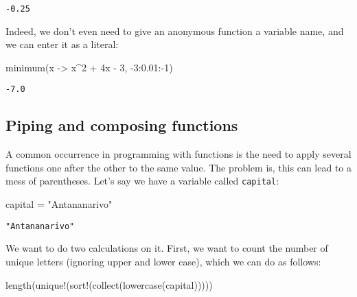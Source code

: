 \documentclass[
  letterpaper,
  DIV=11,
  numbers=noendperiod]{scrreprt}
\newenvironment{Shaded}{\begin{snugshade}}{\end{snugshade}}
\newcommand{\FloatTok}[1]{\textcolor[rgb]{0.68,0.00,0.00}{#1}}
\newcommand{\FunctionTok}[1]{\textcolor[rgb]{0.28,0.35,0.67}{#1}}
\newcommand{\NormalTok}[1]{\textcolor[rgb]{0.00,0.23,0.31}{#1}}
\newcommand{\OperatorTok}[1]{\textcolor[rgb]{0.37,0.37,0.37}{#1}}
\newcommand{\StringTok}[1]{\textcolor[rgb]{0.13,0.47,0.30}{#1}}
\begin{document}
\begin{verbatim}
-0.25
\end{verbatim}

Indeed, we don't even need to give an anonymous function a variable
name, and we can enter it as a literal:

\begin{Shaded}
\begin{Highlighting}[]
\FunctionTok{minimum}\NormalTok{(x }\OperatorTok{{-}\textgreater{}}\NormalTok{ x}\OperatorTok{\^{}}\FloatTok{2} \OperatorTok{+} \FloatTok{4}\NormalTok{x }\OperatorTok{{-}} \FloatTok{3}\NormalTok{, }\OperatorTok{{-}}\FloatTok{3}\OperatorTok{:}\FloatTok{0.01}\OperatorTok{:{-}}\FloatTok{1}\NormalTok{)}
\end{Highlighting}
\end{Shaded}

\begin{verbatim}
-7.0
\end{verbatim}

\hypertarget{piping-and-composing-functions}{%
\subsection{Piping and composing
functions}\label{piping-and-composing-functions}}

A common occurrence in programming with functions is the need to apply
several functions one after the other to the same value. The problem is,
this can lead to a mess of parentheses. Let's say we have a variable
called \texttt{capital}:

\begin{Shaded}
\begin{Highlighting}[]
\NormalTok{capital }\OperatorTok{=} \StringTok{"Antananarivo"}
\end{Highlighting}
\end{Shaded}

\begin{verbatim}
"Antananarivo"
\end{verbatim}

We want to do two calculations on it. First, we want to count the number
of unique letters (ignoring upper and lower case), which we can do as
follows:

\begin{Shaded}
\begin{Highlighting}[]
\FunctionTok{length}\NormalTok{(}\FunctionTok{unique!}\NormalTok{(}\FunctionTok{sort!}\NormalTok{(}\FunctionTok{collect}\NormalTok{(}\FunctionTok{lowercase}\NormalTok{(capital)))))}
\end{Highlighting}
\end{Shaded}
\end{document}
